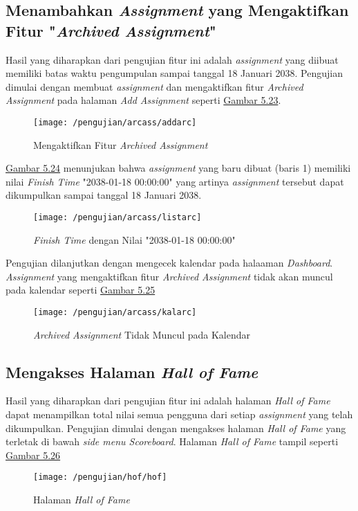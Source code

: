 	\subsection{Menambahkan \textit{Assignment} yang Mengaktifkan Fitur "\textit{Archived Assignment}"}
	Hasil yang diharapkan dari pengujian fitur ini adalah \textit{\textit{assignment}} yang diibuat memiliki batas waktu pengumpulan sampai tanggal 18 Januari 2038. Pengujian dimulai dengan membuat \textit{assignment} dan mengaktifkan fitur \textit{Archived Assignment} pada halaman \textit{Add Assignment} seperti \hyperref[fig:arc]{Gambar 5.23}.
	\begin{figure}[H]
		\centering  
		\texttt{[image: /pengujian/arcass/addarc]}  
		\caption[Mengaktifkan Fitur \textit{Archived Assignment}]{Mengaktifkan Fitur \textit{Archived Assignment}} 
		\label{fig:arc} 
	\end{figure}
	
	\hyperref[fig:listarc]{Gambar 5.24} menunjukan bahwa \textit{assignment} yang baru dibuat (baris 1) memiliki nilai \textit{Finish Time} "2038-01-18 00:00:00" yang artinya \textit{assignment} tersebut dapat dikumpulkan sampai tanggal 18 Januari 2038.
	\begin{figure}[H]
		\centering  
		\texttt{[image: /pengujian/arcass/listarc]}  
		\caption[\textit{Finish Time} dengan Nilai "2038-01-18 00:00:00"]{\textit{Finish Time} dengan Nilai "2038-01-18 00:00:00"} 
		\label{fig:listarc} 
	\end{figure}

	Pengujian dilanjutkan dengan mengecek kalendar pada halaaman \textit{Dashboard}. \textit{Assignment} yang mengaktifkan fitur \textit{Archived Assignment} tidak akan muncul pada kalendar seperti \hyperref[fig:listarc]{Gambar 5.25}
	\begin{figure}[H]
		\centering  
		\texttt{[image: /pengujian/arcass/kalarc]}  
		\caption[\textit{Archived Assignment} Tidak Muncul pada Kalendar]{\textit{Archived Assignment} Tidak Muncul pada Kalendar} 
		\label{fig:kalarc} 
	\end{figure}

	\subsection{Mengakses Halaman \textit{Hall of Fame}}
	Hasil yang diharapkan dari pengujian fitur ini adalah halaman \textit{Hall of Fame} dapat menampilkan total nilai semua pengguna dari setiap \textit{assignment} yang telah dikumpulkan. Pengujian dimulai dengan mengakses halaman \textit{Hall of Fame} yang terletak di bawah \textit{side menu Scoreboard}. Halaman \textit{Hall of Fame} tampil seperti \hyperref[fig:halhof]{Gambar 5.26}
	\begin{figure}[H]
		\centering  
		\texttt{[image: /pengujian/hof/hof]}  
		\caption[Halaman \textit{Hall of Fame}]{Halaman \textit{Hall of Fame}} 
		\label{fig:halhof} 
	\end{figure}

